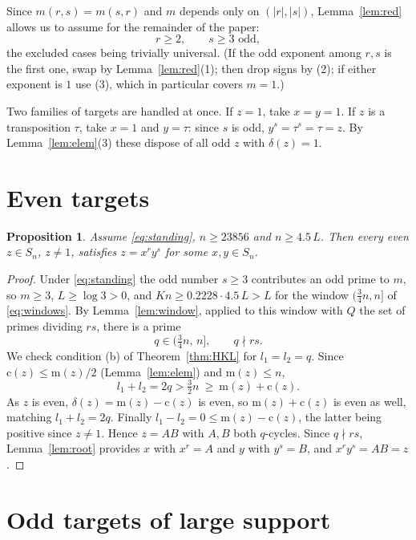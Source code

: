 \documentclass[11pt]{amsart}
\numberwithin{equation}{section}
\newtheorem{proposition}[theorem]{Proposition}
\theoremstyle{remark}
\newcommand{\md}{\mathrm{m}}   %
\newcommand{\cy}{\mathrm{c}}   %
\begin{document}
Since $m(r,s)=m(s,r)$ and $m$ depends only on $(|r|,|s|)$, Lemma~\ref{lem:red}
allows us to assume for the remainder of the paper:
\begin{equation}\label{eq:standing}
r\ge 2,\qquad s\ge 3 \text{ odd},
\end{equation}
the excluded cases being trivially universal. (If the odd exponent among $r,s$ is
the first one, swap by Lemma~\ref{lem:red}(1); then drop signs by (2); if either
exponent is $1$ use (3), which in particular covers $m=1$.)

Two families of targets are handled at once. If $z=1$, take $x=y=1$. If $z$ is a
transposition $\tau$, take $x=1$ and $y=\tau$: since $s$ is odd,
$y^s=\tau^s=\tau=z$. By Lemma~\ref{lem:elem}(3) these dispose of all odd $z$ with
$\delta(z)=1$.

\section{Even targets}\label{sec:even}

\begin{proposition}\label{prop:even}
Assume \eqref{eq:standing}, $n\ge 23856$ and $n\ge4.5\,L$. Then every even
$z\in S_n$, $z\neq 1$, satisfies $z=x^ry^s$ for some $x,y\in S_n$.
\end{proposition}

\begin{proof}
Under \eqref{eq:standing} the odd number $s\ge3$ contributes an odd prime to $m$,
so $m\ge 3$, $L\ge\log 3>0$, and
$Kn\ge 0.2228\cdot4.5\,L>L$ for the window $(\tfrac34n,n]$ of
\eqref{eq:windows}. By Lemma~\ref{lem:window}, applied to this window with $Q$
the set of primes dividing $rs$, there is a prime
\[
q\in(\tfrac34 n,\,n],\qquad q\nmid rs .
\]
We check condition (b) of Theorem~\ref{thm:HKL} for $l_1=l_2=q$. Since
$\cy(z)\le \md(z)/2$ (Lemma~\ref{lem:elem}) and $\md(z)\le n$,
\[
l_1+l_2=2q>\tfrac32n\ \ge\ \md(z)+\cy(z) .
\]
As $z$ is even, $\delta(z)=\md(z)-\cy(z)$ is even, so $\md(z)+\cy(z)$ is even as
well, matching $l_1+l_2=2q$. Finally $l_1-l_2=0\le \md(z)-\cy(z)$, the latter
being positive since $z\neq 1$. Hence $z=AB$ with $A,B$ both $q$-cycles. Since
$q\nmid rs$, Lemma~\ref{lem:root} provides $x$ with $x^r=A$ and $y$ with $y^s=B$,
and $x^ry^s=AB=z$.
\end{proof}

\section{Odd targets of large support}\label{sec:dense}
\end{document}
